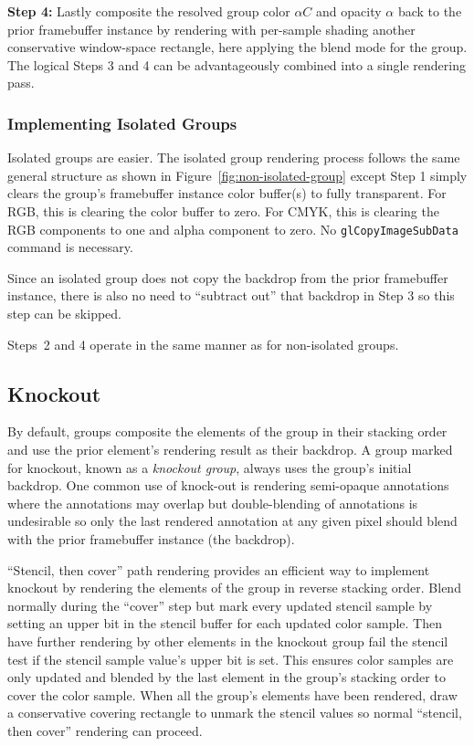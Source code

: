 {\bf Step 4:} 
Lastly composite the resolved group color $\alpha C$ and opacity $\alpha$ back to the prior framebuffer instance by
rendering
with per-sample shading
another conservative window-space rectangle, here applying the blend mode for the group.
The logical Steps 3 and 4
can be advantageously combined into a single rendering pass.

\subsubsection{Implementing Isolated Groups}
\label{sec:isolated-groups}

Isolated groups are easier.
The isolated group rendering process follows the same general structure as shown in
Figure~\ref{fig:non-isolated-group} except Step 1 simply clears the group's framebuffer instance color buffer(s)
to fully transparent.  For RGB, this is clearing the color buffer to zero.  For CMYK, this is clearing the
RGB components to one and alpha component to zero.  No {\tt glCopyImageSubData} command is necessary.

Since an isolated group does not copy the backdrop from the prior framebuffer instance,
there is also no need to ``subtract out'' that backdrop in Step 3 so this step can be skipped.

Steps~2 and 4 operate in the same manner as for non-isolated groups.

\subsection{Knockout}
\label{sec:knockout}

By default, groups composite the elements of the group in their stacking
order and use the prior element's rendering result as their backdrop.
A group marked for knockout, known as a {\em knockout group}, always
uses the group's initial backdrop.  One common use of knock-out is
rendering semi-opaque annotations where the annotations may overlap but
double-blending of annotations is undesirable so only the last rendered annotation at
any given pixel should blend with the prior framebuffer instance (the
backdrop).

``Stencil, then cover'' path rendering provides an efficient way to
implement knockout by rendering the elements of the group in reverse
stacking order.  Blend normally during the ``cover'' step but mark every
updated stencil sample by setting an upper bit in the stencil buffer
for each updated color sample.  Then have further rendering by other
elements in the knockout group fail the stencil test if the stencil sample
value's upper bit is set.  This ensures color samples are only updated
and blended by the last element in the group's stacking order to cover
the color sample.  When all the group's elements have been rendered,
draw a conservative covering rectangle to unmark the stencil values so
normal ``stencil, then cover'' rendering can proceed.

